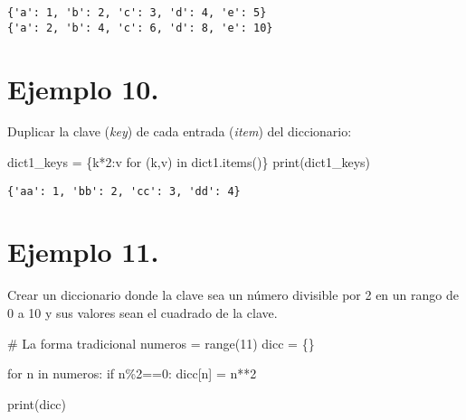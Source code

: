 \documentclass[
  letterpaper,
  DIV=11,
  numbers=noendperiod]{scrreprt}
\newenvironment{Shaded}{\begin{snugshade}}{\end{snugshade}}
\newcommand{\BuiltInTok}[1]{\textcolor[rgb]{0.00,0.23,0.31}{#1}}
\newcommand{\CommentTok}[1]{\textcolor[rgb]{0.37,0.37,0.37}{#1}}
\newcommand{\ControlFlowTok}[1]{\textcolor[rgb]{0.00,0.23,0.31}{#1}}
\newcommand{\DecValTok}[1]{\textcolor[rgb]{0.68,0.00,0.00}{#1}}
\newcommand{\KeywordTok}[1]{\textcolor[rgb]{0.00,0.23,0.31}{#1}}
\newcommand{\NormalTok}[1]{\textcolor[rgb]{0.00,0.23,0.31}{#1}}
\newcommand{\OperatorTok}[1]{\textcolor[rgb]{0.37,0.37,0.37}{#1}}
\begin{document}
\begin{verbatim}
{'a': 1, 'b': 2, 'c': 3, 'd': 4, 'e': 5}
{'a': 2, 'b': 4, 'c': 6, 'd': 8, 'e': 10}
\end{verbatim}

\section{\texorpdfstring{\textbf{Ejemplo
10.}}{Ejemplo 10.}}\label{ejemplo-10.-1}

Duplicar la clave (\emph{key}) de cada entrada (\emph{item}) del
diccionario:

\begin{Shaded}
\begin{Highlighting}[]
\NormalTok{dict1\_keys }\OperatorTok{=}\NormalTok{ \{k}\OperatorTok{*}\DecValTok{2}\NormalTok{:v }\ControlFlowTok{for}\NormalTok{ (k,v) }\KeywordTok{in}\NormalTok{ dict1.items()\}}
\BuiltInTok{print}\NormalTok{(dict1\_keys)}
\end{Highlighting}
\end{Shaded}

\begin{verbatim}
{'aa': 1, 'bb': 2, 'cc': 3, 'dd': 4}
\end{verbatim}

\section{\texorpdfstring{\textbf{Ejemplo
11.}}{Ejemplo 11.}}\label{ejemplo-11.-1}

Crear un diccionario donde la clave sea un número divisible por 2 en un
rango de 0 a 10 y sus valores sean el cuadrado de la clave.

\begin{Shaded}
\begin{Highlighting}[]
\CommentTok{\# La forma tradicional}
\NormalTok{numeros }\OperatorTok{=} \BuiltInTok{range}\NormalTok{(}\DecValTok{11}\NormalTok{)}
\NormalTok{dicc }\OperatorTok{=}\NormalTok{ \{\}}

\ControlFlowTok{for}\NormalTok{ n }\KeywordTok{in}\NormalTok{ numeros:}
    \ControlFlowTok{if}\NormalTok{ n}\OperatorTok{\%}\DecValTok{2}\OperatorTok{==}\DecValTok{0}\NormalTok{:}
\NormalTok{        dicc[n] }\OperatorTok{=}\NormalTok{ n}\OperatorTok{**}\DecValTok{2}

\BuiltInTok{print}\NormalTok{(dicc)}
\end{Highlighting}
\end{Shaded}
\end{document}
